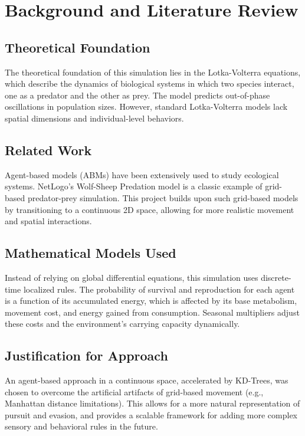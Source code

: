 \documentclass[12pt]{article}
\begin{document}
\section{Background and Literature Review}

\subsection{Theoretical Foundation}
The theoretical foundation of this simulation lies in the Lotka-Volterra equations, which describe the dynamics of biological systems in which two species interact, one as a predator and the other as prey. The model predicts out-of-phase oscillations in population sizes. However, standard Lotka-Volterra models lack spatial dimensions and individual-level behaviors.

\subsection{Related Work}
Agent-based models (ABMs) have been extensively used to study ecological systems. NetLogo's Wolf-Sheep Predation model is a classic example of grid-based predator-prey simulation. This project builds upon such grid-based models by transitioning to a continuous 2D space, allowing for more realistic movement and spatial interactions.

\subsection{Mathematical Models Used}
Instead of relying on global differential equations, this simulation uses discrete-time localized rules. The probability of survival and reproduction for each agent is a function of its accumulated energy, which is affected by its base metabolism, movement cost, and energy gained from consumption. Seasonal multipliers adjust these costs and the environment's carrying capacity dynamically.

\subsection{Justification for Approach}
An agent-based approach in a continuous space, accelerated by KD-Trees, was chosen to overcome the artificial artifacts of grid-based movement (e.g., Manhattan distance limitations). This allows for a more natural representation of pursuit and evasion, and provides a scalable framework for adding more complex sensory and behavioral rules in the future.
\end{document}

